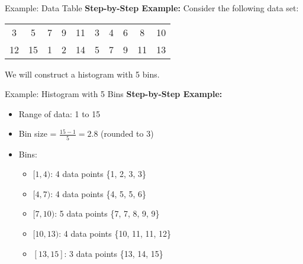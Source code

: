 \documentclass[handout]{beamer} %
\begin{document}
\begin{frame}{Example: Data Table}
    \textbf{Step-by-Step Example:}
    \vspace{0.5cm}
    Consider the following data set:
    
    \begin{center}
        \begin{tabular}{cccccccccc}
            3 & 5 & 7 & 9 & 11 & 3 & 4 & 6 & 8 & 10 \\
            12 & 15 & 1 & 2 & 14 & 5 & 7 & 9 & 11 & 13 \\
        \end{tabular}
    \end{center}
    
    \vspace{0.5cm}
    We will construct a histogram with 5 bins.
\end{frame}

\begin{frame}{Example: Histogram with 5 Bins }
    \textbf{Step-by-Step Example:}
    \begin{itemize}
        \item Range of data: 1 to 15
        \item Bin size = \( \frac{15 - 1}{5} = 2.8 \) (rounded to 3)
        \item Bins: 
        \begin{itemize}
            \item \([1, 4)\): 4 data points \{1, 2, 3, 3\}
            \item \([4, 7)\): 4 data points \{4, 5, 5, 6\}
            \item \([7, 10)\): 5 data points \{7, 7, 8, 9, 9\}
            \item \([10, 13)\): 4 data points \{10, 11, 11, 12\}
            \item \([13, 15]\): 3 data points \{13, 14, 15\}
        \end{itemize}
    \end{itemize}
    

\end{frame}
\end{document}
